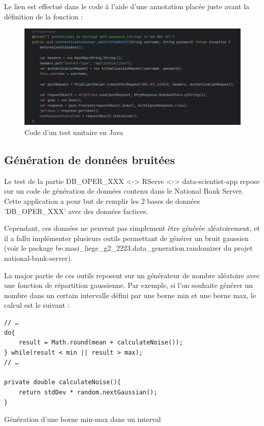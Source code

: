 Le lien est effectué dans le code à l'aide d'une annotation placée juste avant la définition de la
fonction :

\begin{figure}[H]
    \centering
    \includegraphics[width=\textwidth]{./img/thibault-Tests_2.png}
    \caption{Code d'un test unitaire en Java}
    \label{fig:thibault-unit-testing-02}
\end{figure}

\subsection{Génération de données bruitées}

Le test de la partie DB\_OPER\_XXX <-> RServe <-> data-scientist-app repose sur un code de génération de données contenu dans le National Bank Server. Cette application a pour but de remplir les 2 bases de données 'DB\_OPER\_XXX' avec des données factices.

Cependant, ces données ne peuvent pas simplement être générée aléatoirement, et il a fallu implémenter plusieurs outils permettant de générer un bruit gaussien (voir le package be.masi\_liege\_g2\_2223.data\_generation.randomizer du projet national-bank-server).

La major partie de ces outils reposent sur un générateur de nombre aléatoire avec une fonction de répartition gaussienne. Par exemple, si l'on souhaite générer un nombre dans un certain intervalle défini par une borne min et une borne max, le calcul est le suivant :

\begin{listing}[H]
    \begin{verbatim}
// …
do{
    result = Math.round(mean + calculateNoise());
} while(result < min || result > max);
// …

private double calculateNoise(){
    return stdDev * random.nextGaussian();
}
    \end{verbatim}
    \caption{Génération d'une borne min-max dans un interval}
    \label{listing:thibault-gen-noise}
\end{listing}

